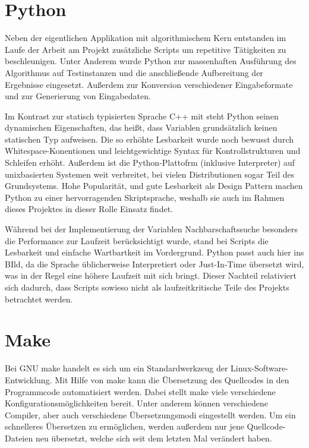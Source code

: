 \section{Python}
\label{sec:python}
Neben der eigentlichen Applikation mit algorithmischem Kern entstanden im Laufe der Arbeit am Projekt zusätzliche Scripts um repetitive Tätigkeiten zu beschleunigen. Unter Anderem wurde Python zur massenhaften Ausführung des Algorithmus auf Testinstanzen und die anschließende Aufbereitung der Ergebnisse eingesetzt. Außerdem zur Konversion verschiedener Eingabeformate und zur Generierung von Eingabedaten.

Im Kontrast zur statisch typisierten Sprache C++ mit steht Python seinen dynamischen Eigenschaften, das heißt, dass Variablen grundsätzlich keinen statischen Typ aufweisen. Die so erhöhte Lesbarkeit wurde noch bewusst durch Whitespace-Konentionen und leichtgewichtige Syntax für Kontrollstrukturen und Schleifen erhöht. Außerdem ist die Python-Plattofrm (inklusive Interpreter) auf unixbasierten Systemen weit verbreitet, bei vielen Distributionen sogar Teil des Grundsystems. Hohe Popularität, und gute Lesbarkeit als Design Pattern machen Python zu einer hervorragenden Skriptsprache, weshalb sie auch im Rahmen dieses Projektes in dieser Rolle Einsatz findet.

Während bei der Implementierung der Variablen Nachbarschaftssuche besonders die Performance zur Laufzeit berücksichtigt wurde, stand bei Scripts die Lesbarkeit und einfache Wartbartkeit im Vordergrund. Python passt auch hier ins BIld, da die Sprache üblicherweise Interpretiert oder Just-In-Time übersetzt wird, was in der Regel eine höhere Laufzeit mit sich bringt. Dieser Nachteil relativiert sich dadurch, dass Scripts sowieso nicht als laufzeitkritische Teile des Projekts betrachtet werden.

\section{Make}
\label{sec:make}
Bei GNU make handelt es sich um ein Standardwerkzeug der Linux-Software-Entwicklung. Mit Hilfe von make kann die Übersetzung des Quellcodes in den Programmcode automatisiert werden. 
Dabei stellt make viele verschiedene Konfigurationsmöglichkeiten bereit. Unter anderem können verschiedene Compiler, aber auch verschiedene Übersetzungsmodi eingestellt werden.
Um ein schnelleres Übersetzen zu ermöglichen, werden außerdem nur jene Quellcode-Dateien neu übersetzt, welche sich seit dem letzten Mal verändert haben. 

